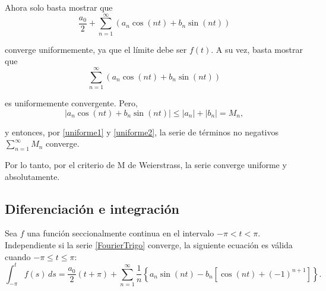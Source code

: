 \begin{demo}
Ahora solo basta mostrar que 
$$\frac{a_0}{2} + \sum_{n=1}^{\infty}(a_n \cos(nt) + b_n \sin(nt))$$

converge uniformemente, ya que el límite debe ser $f(t)$. A su vez, basta mostrar que 
$$\sum_{n=1}^{\infty} (a_n \cos(nt) + b_n \sin(nt))$$

es uniformemente convergente. Pero,
$$|a_n \cos(nt) + b_n \sin(nt)| \leq |a_n| + |b_n| = M_n,$$

y entonces, por \eqref{uniforme1} y \eqref{uniforme2}, la serie de términos no negativos $\sum\limits_{n=1}^{\infty} M_n$ converge.

Por lo tanto, por el criterio de M de Weierstrass, la serie converge uniforme y absolutamente.

\end{demo}

\subsection*{Diferenciación e integración}

\begin{teorema}[Integración]
Sea $f$ una función seccionalmente continua en el intervalo $-\pi < t < \pi$. Independiente si la serie \eqref{FourierTrigo} converge, la siguiente ecuación es válida cuando $-\pi \leq t \leq \pi$:
\begin{equation}
  \int_{-\pi}^t f(s) \,ds = \frac{a_0}{2} (t + \pi) + \sum_{n=1}^{\infty} \frac{1}{n} \left\{ a_n \sin(nt) - b_n[\cos(nt) + (-1)^{n+1}] \right\}.    \label{Integral}
\end{equation}
\end{teorema}

